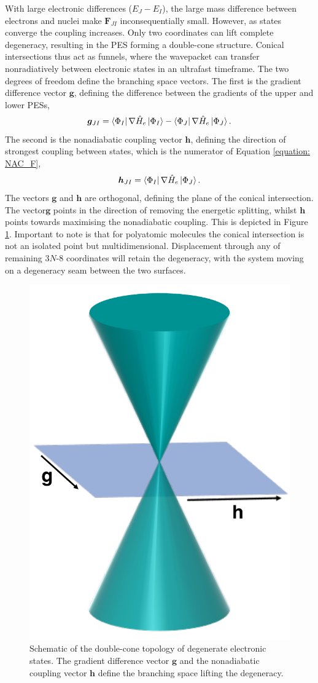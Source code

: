 With large electronic differences ($E_{J}-E_{I}$), the large mass difference between electrons and nuclei make $\bm{F}_{JI}$ inconsequentially small. However, as states converge the coupling increases. Only two coordinates can lift complete degeneracy, resulting in the \ac{PES} forming a double-cone structure. Conical intersections thus act as funnels, where the wavepacket can transfer nonradiatively between electronic states in an ultrafast timeframe. The two degrees of freedom define the branching space vectors. The first is the gradient difference vector $\bm{g}$, defining the difference between the gradients of the upper and lower \acp{PES},
\begin{equation}
    \bm{g}_{JI}=\bra{\Phi_{I}}\nabla{}\hat{H}_{e}\ket{\Phi_{I}}-\bra{\Phi_{J}}\nabla{}\hat{H}_{e}\ket{\Phi_{J}}.
\end{equation}
The second is the nonadiabatic coupling vector $\bm{h}$, defining the direction of strongest coupling between states, which is the numerator of Equation \ref{equation: NAC_F},
\begin{equation}
    \bm{h}_{JI}=\bra{\Phi_{I}}\nabla{}\hat{H}_{e}\ket{\Phi_{J}}.
\end{equation}
The vectors $\bm{g}$ and $\bm{h}$ are orthogonal, defining the plane of the conical intersection. The vector$\bm{g}$ points in the direction of removing the energetic splitting, whilst $\bm{h}$ points towards maximising the nonadiabatic coupling.\cite{Levine2008} This is depicted in Figure \ref{figure: Cone}. Important to note is that for polyatomic molecules the conical intersection is not an isolated point but multidimensional. Displacement through any of remaining 3$N$-8 coordinates will retain the degeneracy, with the system moving on a degeneracy seam between the two surfaces.
\begin{figure}[H]
\centering
  \includegraphics[width=0.4\linewidth]{2Theory/cone.pdf}
  \caption[Schematic of the double-cone topology of degenerate electronic states]{Schematic of the double-cone topology of degenerate electronic states. The gradient difference vector $\bm{g}$ and the nonadiabatic coupling vector $\bm{h}$ define the branching space lifting the degeneracy.}
  \label{figure: Cone}
\end{figure}
